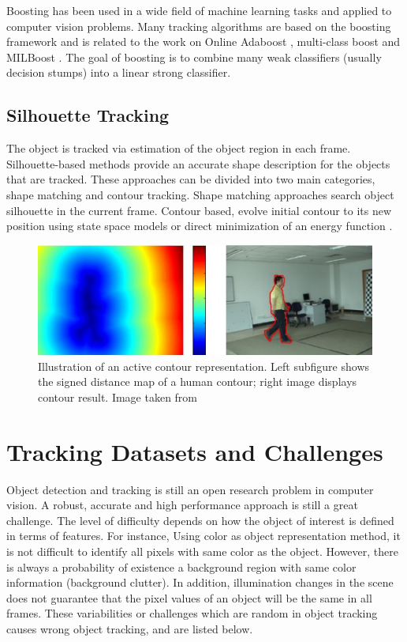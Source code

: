 Boosting has been used in a wide field of machine learning tasks and
applied to computer vision problems. Many tracking algorithms are based on the
boosting framework \cite{Freund1997a} and is related to the work on
Online Adaboost \cite{Avidan2007,Grabner2008,Oza2000}, multi-class boost
\cite{Saffari2010} and MILBoost \cite{Babenko2010}. The goal of boosting is
to combine many weak classifiers (usually decision stumps) into a linear
strong classifier.

\subsection{Silhouette Tracking}

The object is tracked via estimation of the object region in each frame.
Silhouette-based methods provide an accurate shape description for the
objects that are tracked. These approaches can be divided into two main
categories, shape matching and contour tracking. Shape matching \cite{Li2001}
approaches search object silhouette in the current frame. Contour based, evolve
initial contour to its new position using state space models or direct
minimization of an energy function \cite{Cremers2003}.

\begin{figure}[h!]
	\centering
		\includegraphics[width=0.9\linewidth]{Figures/contour.png}
	\caption[Illustration of an active contour representation]
			{Illustration of an active contour representation. Left subfigure
			shows the signed distance map of a human contour; right
			image displays contour result. Image taken from \cite{Yilmaz2006}}
	\label{fig::contour}
\end{figure}	
\section{Tracking Datasets and Challenges}
\label{sec::datasets}

Object detection and tracking is still an open research problem in computer
vision. A robust, accurate and high performance approach is still a great
challenge. The level of difficulty depends on how the object of interest is
defined in terms of features. For instance, Using color as object representation
method, it is not difficult to identify all pixels with same color as the
object. However, there is always a probability of existence a background region
with same color information (background clutter). In addition, illumination
changes in the scene does not guarantee that the pixel values of an object
will be the same in all frames. These variabilities or challenges which are
random in object tracking causes wrong object tracking, and are listed below.

